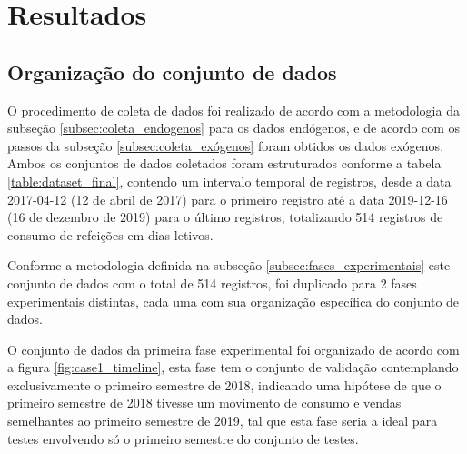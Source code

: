 \chapter{Resultados} \label{cap:resultados}



\section{Organização do conjunto de dados}

    O procedimento de coleta de dados foi realizado de acordo com a metodologia da subseção \ref{subsec:coleta_endogenos} para os dados endógenos, e de acordo com os passos da subseção \ref{subsec:coleta_exógenos} foram obtidos os dados exógenos. 
    Ambos os conjuntos de dados coletados foram estruturados conforme a tabela \ref{table:dataset_final}, contendo um intervalo temporal de registros, desde a data 2017-04-12 (12 de abril de 2017) para o primeiro registro até a data 2019-12-16 (16 de dezembro de 2019) para o último registros, totalizando 514 registros de consumo de refeições em dias letivos.
    
    Conforme a metodologia definida na subseção \ref{subsec:fases_experimentais} este conjunto de dados com o total de 514 registros, foi duplicado para 2 fases experimentais distintas, cada uma com sua organização específica do conjunto de dados.
    
    O conjunto de dados da primeira fase experimental foi organizado de acordo com a figura \ref{fig:case1_timeline}, esta fase tem o conjunto de validação contemplando exclusivamente o primeiro semestre de 2018, indicando uma hipótese de que o primeiro semestre de 2018 tivesse um movimento de consumo e vendas semelhantes ao primeiro semestre de 2019, tal que esta fase seria a ideal para testes envolvendo só o primeiro semestre do conjunto de testes.

